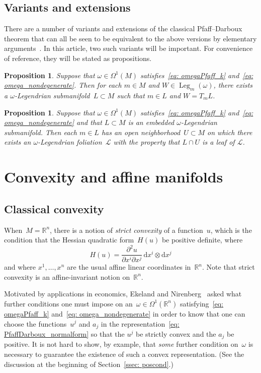 \documentclass[pdftex]{sigma}
\renewcommand{\d}{\mathrm{d}}%
\newcommand{\cL}{{\mathcal L}}
\newcommand{\bbR}{{\mathbb R}}
\newcommand{\Leg}{\operatorname{Leg}}
\numberwithin{equation}{section}
\newtheorem{Proposition}[Theorem]{Proposition}
 { \theoremstyle{definition}
\newtheorem{Definition}[Theorem]{Definition}
\newtheorem{Note}[Theorem]{Note}
\newtheorem{Example}[Theorem]{Example}
\newtheorem{Remark}[Theorem]{Remark} }
\begin{document}
\subsection{Variants and extensions}
There are a number of variants and extensions
of the classical Pfaff--Darboux theorem
that can all be seen to be equivalent to the above versions
by elementary arguments~\cite[Chapter II, Section~3]{MR1083148}.
In this article, two such variants will be important.
For convenience of reference, they will be stated as propositions.

\begin{Proposition}\label{prop: Legfromtangent}
Suppose that $\omega\in\Omega^1(M)$ satisfies~\eqref{eq: omegaPfaff_k}
and~\eqref{eq: omega_nondegenerate}. Then for each $m\in M$
and $W\in\Leg_m(\omega)$,
there exists a $\omega$-Legendrian submanifold~$L\subset M$
such that $m\in L$ and $W = T_mL$.
\end{Proposition}

\begin{Proposition}\label{prop: folfromleg}
Suppose that $\omega\in\Omega^1(M)$ satisfies~\eqref{eq: omegaPfaff_k}
and~\eqref{eq: omega_nondegenerate} and that $L\subset M$
is an embedded $\omega$-Legendrian submanifold. Then each $m\in L$
has an open neighborhood~$U\subset M$ on which there exists
an $\omega$-Legendrian foliation~$\cL$ with the property that $L\cap U$
is a leaf of $\cL$.
\end{Proposition}


\section{Convexity and affine manifolds}

\subsection{Classical convexity}
When~$M=\bbR^n$, there is a notion of \emph{strict convexity}
of a function~$u$, which is the condition
that the Hessian quadratic form~$H(u)$ be positive definite, where
\begin{equation}\label{eq: flat_Hessian}
H(u) = {\frac{\partial^2 u}{\partial x^i\partial x^j}}
\,\d x^i\otimes\d x^j
\end{equation}
and where $x^1,\ldots,x^n$
are the usual affine linear coordinates in~$\bbR^n$.
Note that strict convexity is an affine-invariant notion on~$\bbR^n$.

Motivated by applications in economics,
Ekeland and Nirenberg~\cite{MR2023129}
asked what further conditions one must impose on an~$\omega\in\Omega^1(\bbR^n)$
satisfying~\eqref{eq: omegaPfaff_k} and~\eqref{eq: omega_nondegenerate}
in order to know that one can choose the functions~$u^j$
and $a_j$ in the representation~\eqref{eq: PfaffDarboux_normalform}
so that the $u^j$ be strictly convex and the $a_j$ be positive.
It is not hard to show, by example, that \emph{some}
further condition on~$\omega$ is necessary
to guarantee the existence of such a convex representation.
(See the discussion at the beginning of Section~\ref{ssec: poscond}.)
\end{document}
